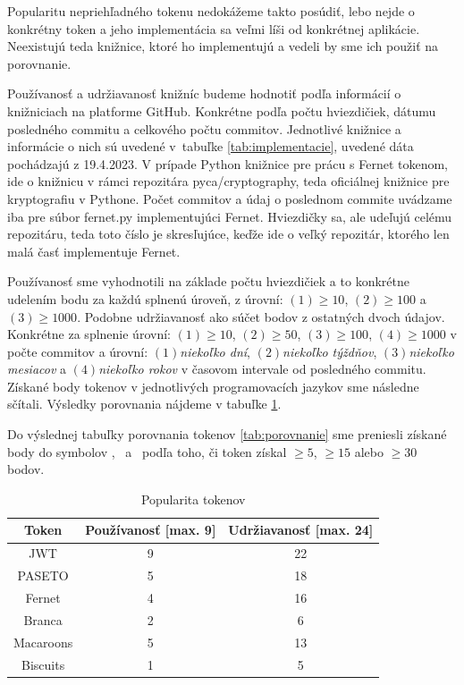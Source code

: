 Popularitu nepriehľadného tokenu nedokážeme takto posúdiť, lebo nejde o konkrétny token a jeho implementácia sa veľmi líši od konkrétnej aplikácie. Neexistujú teda knižnice, ktoré ho implementujú a vedeli by sme ich použiť na porovnanie.

Používanosť a udržiavanosť knižníc budeme hodnotiť podľa informácií o knižniciach na platforme GitHub. Konkrétne podľa počtu hviezdičiek, dátumu posledného commitu a celkového počtu commitov. Jednotlivé knižnice a informácie o nich sú uvedené v~tabuľke \ref{tab:implementacie}, uvedené dáta pochádzajú z 19.4.2023. V prípade Python knižnice pre prácu s Fernet tokenom, ide o knižnicu v rámci repozitára pyca/cryptography, teda oficiálnej knižnice pre kryptografiu v Pythone. Počet commitov a údaj o poslednom commite uvádzame iba pre súbor fernet.py implementujúci Fernet. Hviezdičky sa, ale udeľujú celému repozitáru, teda toto číslo je skresľujúce, keďže ide o veľký repozitár, ktorého len malá časť implementuje Fernet. 

Používanosť sme vyhodnotili na základe počtu hviezdičiek a to konkrétne udelením bodu za každú splnenú úroveň, z úrovní: $(1)\ge10$, $(2)\ge100$ a $(3)\ge1000$. Podobne udržiavanosť ako súčet bodov z ostatných dvoch údajov. Konkrétne za splnenie úrovní: $(1)\ge10$, $(2)\ge50$, $(3)\ge100$, $(4)\ge1000$ v počte commitov a úrovní: $(1)$\textit{niekoľko dní}, $(2)$\textit{niekoľko týždňov}, $(3)$\textit{niekoľko mesiacov} a $(4)$\textit{niekoľko rokov} v časovom intervale od posledného commitu. Získané body tokenov v jednotlivých programovacích jazykov sme následne sčítali. Výsledky porovnania nájdeme v tabuľke \ref{tab:popularita}.

Do výslednej tabuľky porovnania tokenov \ref{tab:porovnanie} sme preniesli získané body do symbolov \Circle, \LEFTcircle ~a \CIRCLE ~podľa toho, či token získal $\ge5$, $\ge15$ alebo $\ge30$ bodov.

\begin{table}[H]
  \begin{center}
    \caption{Popularita tokenov}
    \label{tab:popularita} %

    \begin{tabular}{ccc}
      \hline
      Token & Používanosť [max. 9] & Udržiavanosť [max. 24]\\
      \hline
      JWT & 9 & 22 \\
      PASETO & 5 & 18 \\
      Fernet & 4 & 16 \\
      Branca & 2 & 6 \\
      Macaroons & 5 & 13 \\
      Biscuits & 1 & 5 \\
      \hline
    \end{tabular}
  \end{center}
\end{table}